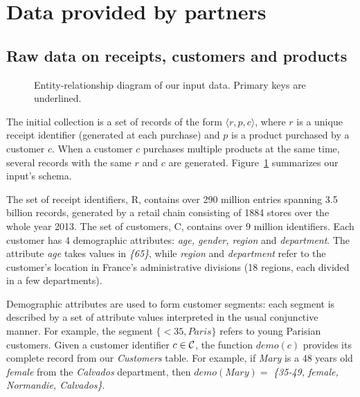 \section{Data provided by \datalyse partners}
\label{sec:pipeline:theirs}


\subsection{Raw data on receipts, customers and products}
\label{sec:model:init}

\begin{figure}
	\centering
	\begin{tikzpicture}
		
	\end{tikzpicture}

  \caption{\label{fig:schema}
    Entity-relationship diagram of our input data.
    Primary keys are underlined.
  }
\end{figure}

The initial collection is a set of records of the form $\langle r, p, c \rangle$,
where $r$ is a unique receipt identifier (generated at each purchase)
and $p$ is a product purchased by a customer $c$.
When a customer $c$ purchases multiple products at the same time,
several records with the same $r$ and $c$ are generated.
Figure~\ref{fig:schema} summarizes our input's schema.

The set of receipt identifiers, {\mf R}, contains over 290 million entries
spanning 3.5 billion records, generated by a retail chain consisting of \num{1884} stores
over the whole year 2013.
The set of customers, {\mf C}, contains over $9$ million identifiers.
Each customer has 4 demographic attributes: {\em age, gender, region} and {\em department}.
The attribute {\em age} takes values in {\em \{<35, 35-49, 50-65, >65\}},
while {\em region} and {\em department} refer to the customer's location
in France's administrative divisions (18 regions, each divided in a few departments).

Demographic attributes are used to form customer segments:
each segment is described by a set of attribute values
interpreted in the usual conjunctive manner.
For example, the segment $\{\mathit{<35},\mathit{Paris}\}$ refers to young Parisian customers.
Given a customer identifier $c \in \cal C$,
the function $\mathit{demo(c)}$ provides its complete record from our {\em Customers} table.
For example, if {\em Mary} is a 48 years old {\em female} from the {\em Calvados} department,
then $\mathit{demo(Mary)} =$ {\em \{35-49, female, Normandie, Calvados\}}.


